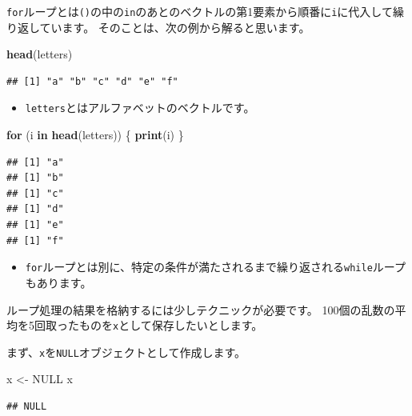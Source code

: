 \documentclass[]{bxjsreport}
\newenvironment{Shaded}{\begin{snugshade}}{\end{snugshade}}
\newcommand{\ControlFlowTok}[1]{\textcolor[rgb]{0.13,0.29,0.53}{\textbf{#1}}}
\newcommand{\KeywordTok}[1]{\textcolor[rgb]{0.13,0.29,0.53}{\textbf{#1}}}
\newcommand{\NormalTok}[1]{#1}
\newcommand{\OtherTok}[1]{\textcolor[rgb]{0.56,0.35,0.01}{#1}}
\newcommand{\StringTok}[1]{\textcolor[rgb]{0.31,0.60,0.02}{#1}}
\providecommand{\tightlist}{%
  \setlength{\itemsep}{0pt}\setlength{\parskip}{0pt}}
\begin{document}
\texttt{for}ループとは\texttt{()}の中の\texttt{in}のあとのベクトルの第1要素から順番に\texttt{i}に代入して繰り返しています。
そのことは、次の例から解ると思います。

\begin{Shaded}
\begin{Highlighting}[]
\KeywordTok{head}\NormalTok{(letters)}
\end{Highlighting}
\end{Shaded}

\begin{verbatim}
## [1] "a" "b" "c" "d" "e" "f"
\end{verbatim}

\begin{itemize}
\tightlist
\item
  \texttt{letters}とはアルファベットのベクトルです。
\end{itemize}

\begin{Shaded}
\begin{Highlighting}[]
\ControlFlowTok{for}\NormalTok{ (i }\ControlFlowTok{in} \KeywordTok{head}\NormalTok{(letters)) \{}
  \KeywordTok{print}\NormalTok{(i)}
\NormalTok{\}}
\end{Highlighting}
\end{Shaded}

\begin{verbatim}
## [1] "a"
## [1] "b"
## [1] "c"
## [1] "d"
## [1] "e"
## [1] "f"
\end{verbatim}

\begin{itemize}
\tightlist
\item
  \texttt{for}ループとは別に、特定の条件が満たされるまで繰り返される\texttt{while}ループもあります。
\end{itemize}

ループ処理の結果を格納するには少しテクニックが必要です。
100個の乱数の平均を5回取ったものを\texttt{x}として保存したいとします。

まず、\texttt{x}を\texttt{NULL}オブジェクトとして作成します。

\begin{Shaded}
\begin{Highlighting}[]
\NormalTok{x <-}\StringTok{ }\OtherTok{NULL}
\NormalTok{x}
\end{Highlighting}
\end{Shaded}

\begin{verbatim}
## NULL
\end{verbatim}
\end{document}
